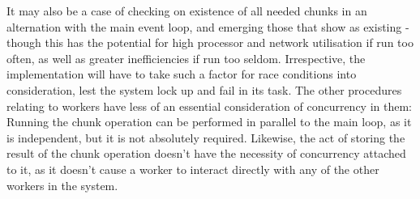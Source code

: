 
It may also be a case of checking on existence of all needed chunks in an alternation with the main event loop, and emerging those that show as existing - though this has the potential for high processor and network utilisation if run too often, as well as greater inefficiencies if run too seldom.
Irrespective, the implementation will have to take such a factor for race conditions into consideration, lest the system lock up and fail in its task.
The other procedures relating to workers have less of an essential consideration of concurrency in them: Running the chunk operation can be performed in parallel to the main loop, as it is independent, but it is not absolutely required.
Likewise, the act of storing the result of the chunk operation doesn't have the necessity of concurrency attached to it, as it doesn't cause a worker to interact directly with any of the other workers in the system.
